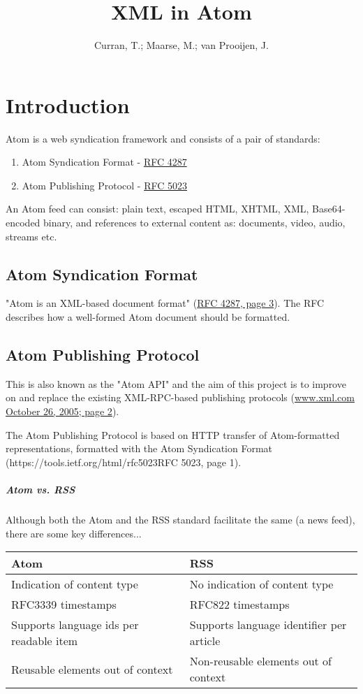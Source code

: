 \documentclass{report}
\begin{document}
\title{XML in Atom}
\author{Curran, T.; Maarse, M.; van Prooijen, J.}

\chapter{Introduction}
Atom is a web syndication framework and consists of a pair of standards:

\begin{enumerate}
\item Atom Syndication Format - \href{https://tools.ietf.org/html/rfc4287}{RFC 4287}
\item Atom Publishing Protocol - \href{https://tools.ietf.org/html/rfc5023}{RFC 5023}
\end{enumerate}

An Atom feed can consist: plain text, escaped HTML, XHTML, XML, Base64-encoded binary, and references to external content as: documents, video, audio, streams etc.

\section{Atom Syndication Format}
"Atom is an XML-based document format" (\href{https://tools.ietf.org/html/rfc4287}{RFC 4287, page 3}). The RFC describes how a well-formed Atom document should be formatted.

\section{Atom Publishing Protocol}
This is also known as the "Atom API" and the aim of this project is to improve on and replace the existing XML-RPC-based publishing protocols (\href{http://www.xml.com/pub/a/2005/10/26/what-is-atom.html?page=2}{www.xml.com October 26, 2005; page 2}).

The Atom Publishing Protocol is based on HTTP transfer of Atom-formatted representations, formatted with the Atom Syndication Format ({https://tools.ietf.org/html/rfc5023}{RFC 5023, page 1}).

\paragraph{Atom vs. RSS}
Although both the Atom and the RSS standard facilitate the same (a news feed), there are some key differences...

\begin{tabular}{|l|l|}
\hline
Atom & RSS \\ \hline
Indication of content type & No indication of content type \\
RFC3339 timestamps & RFC822 timestamps \\
Supports language ids per readable item & Supports language identifier per article \\
Reusable elements out of context & Non-reusable elements out of context \\
\hline
\end{tabular}
\end{document}
